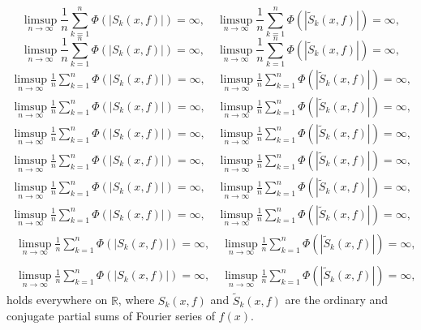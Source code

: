 \documentclass{amsart}
\numberwithin{equation}{section}
\begin{document}
{
\begin{equation*} 
\limsup_{n\to\infty}\frac{1}{n}\sum_{k=1}^n\Phi(|S_k(x,f)|)=\infty,\quad \limsup_{n\to\infty}\frac{1}{n}\sum_{k=1}^n\Phi(|\tilde S_k(x,f)|)=\infty,
 \end{equation*}\fi  
{}\begin{equation}
\limsup_{n\to\infty}\frac{1}{n}\sum_{k=1}^n\Phi(|S_k(x,f)|)=\infty,\quad \limsup_{n\to\infty}\frac{1}{n}\sum_{k=1}^n\Phi(|\tilde S_k(x,f)|)=\infty,
\end{equation}\fi   
{}\begin{align*}
\limsup_{n\to\infty}\frac{1}{n}\sum_{k=1}^n\Phi(|S_k(x,f)|)=\infty,\quad \limsup_{n\to\infty}\frac{1}{n}\sum_{k=1}^n\Phi(|\tilde S_k(x,f)|)=\infty,
\end{align*}\fi   
{}\begin{align}
\limsup_{n\to\infty}\frac{1}{n}\sum_{k=1}^n\Phi(|S_k(x,f)|)=\infty,\quad \limsup_{n\to\infty}\frac{1}{n}\sum_{k=1}^n\Phi(|\tilde S_k(x,f)|)=\infty,
\end{align}\fi    
{}\begin{gather*}
\limsup_{n\to\infty}\frac{1}{n}\sum_{k=1}^n\Phi(|S_k(x,f)|)=\infty,\quad \limsup_{n\to\infty}\frac{1}{n}\sum_{k=1}^n\Phi(|\tilde S_k(x,f)|)=\infty,
\end{gather*}\fi  
{}\begin{gather}
\limsup_{n\to\infty}\frac{1}{n}\sum_{k=1}^n\Phi(|S_k(x,f)|)=\infty,\quad \limsup_{n\to\infty}\frac{1}{n}\sum_{k=1}^n\Phi(|\tilde S_k(x,f)|)=\infty,
\end{gather}\fi   
{}\begin{multline*}
\limsup_{n\to\infty}\frac{1}{n}\sum_{k=1}^n\Phi(|S_k(x,f)|)=\infty,\quad \limsup_{n\to\infty}\frac{1}{n}\sum_{k=1}^n\Phi(|\tilde S_k(x,f)|)=\infty,
\end{multline*}\fi  
{}\begin{multline}
\limsup_{n\to\infty}\frac{1}{n}\sum_{k=1}^n\Phi(|S_k(x,f)|)=\infty,\quad \limsup_{n\to\infty}\frac{1}{n}\sum_{k=1}^n\Phi(|\tilde S_k(x,f)|)=\infty,
\end{multline}\fi  
{}\begin{multline*}\begin{split}
\limsup_{n\to\infty}\frac{1}{n}\sum_{k=1}^n\Phi(|S_k(x,f)|)=\infty,\quad \limsup_{n\to\infty}\frac{1}{n}\sum_{k=1}^n\Phi(|\tilde S_k(x,f)|)=\infty,
\end{split}\end{multline*}\fi
{}\begin{multline}\begin{split}
\limsup_{n\to\infty}\frac{1}{n}\sum_{k=1}^n\Phi(|S_k(x,f)|)=\infty,\quad \limsup_{n\to\infty}\frac{1}{n}\sum_{k=1}^n\Phi(|\tilde S_k(x,f)|)=\infty,
\end{split}\end{multline}\fi
}
holds everywhere on ${\ensuremath{\mathbb R}}$, where $S_k(x,f)$ and $\tilde S_k(x,f)$ are the ordinary and conjugate partial sums of Fourier series of $f(x)$.
\end{document}
